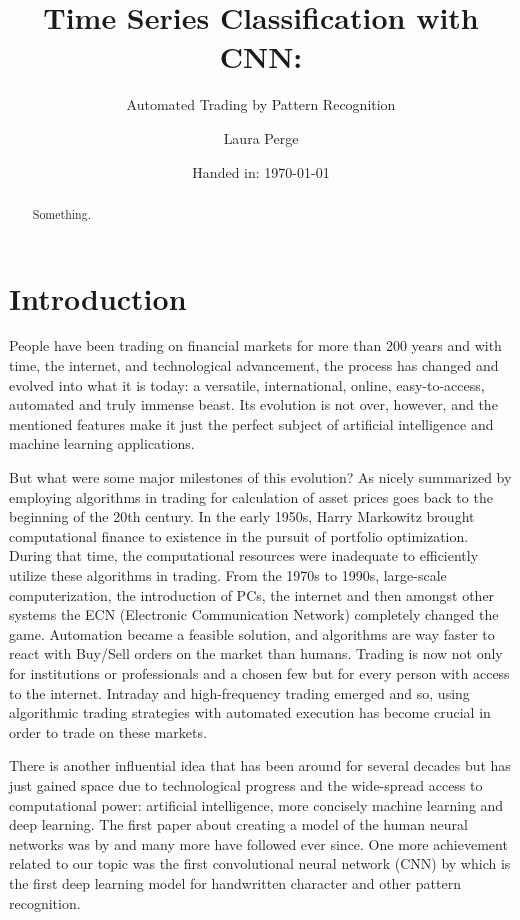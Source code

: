 \documentclass[11pt, a4paper]{article}
\author{Laura Perge}
\title{Time Series Classification with CNN:}
\subtitle{ Automated Trading by Pattern Recognition}
\date{Handed in: \today}
\begin{document}
\maketitle

\tableofcontents

\begin{abstract}
    Something.
\end{abstract}

\section{Introduction}
People have been trading on financial markets for more than 200 years and with time, the internet, and technological advancement, the process has changed and evolved into what it is today:  
a versatile, international, online, easy-to-access, automated and truly immense beast. Its evolution is not over, however, and the mentioned features make it just the perfect subject of 
artificial intelligence and machine learning applications. 

But what were some major milestones of this evolution? As nicely summarized by \cite{rialtohistory}  employing algorithms in trading for calculation of asset prices goes back to the beginning of 
the 20th century. In the early 1950s, Harry Markowitz brought computational finance to existence in the pursuit of portfolio optimization. During that time, the computational 
resources were inadequate to efficiently utilize these algorithms in trading. From the 1970s to 1990s, 
large-scale computerization, the introduction of PCs, the internet and then amongst other systems the ECN (Electronic Communication Network) completely changed the game. Automation became a 
feasible solution, and algorithms are way faster to react with Buy/Sell orders on the market than humans. Trading is now not only for institutions or professionals and a chosen few but for 
every person with access to the internet. Intraday and high-frequency trading emerged and so, using algorithmic trading strategies with automated execution has become crucial in order to 
trade on these markets. 

There is another influential idea that has been around for several decades but has just gained space due to technological progress and the wide-spread access to computational power: artificial intelligence, more 
concisely machine learning and deep learning. 
The first paper about creating a model of the human neural networks was by \cite{mcculloch1943logical} and many more have followed ever since. 
One more achievement related to our topic was the first convolutional neural network (CNN) by \cite{fukushima1979neural} which is the first deep learning model for handwritten character and other 
pattern recognition.
\end{document}
